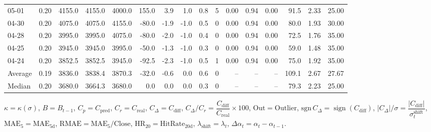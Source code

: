 \begin{threeparttable}
{\begin{tabular}{lrrrrrrrrrrrrrrr}
  05-01 &     0.20 & 4155.0 & 4155.0 & 4000.0 &      155.0 &            3.9 &                      1.0 &                 0.8 &              5 &       0.00 &      0.94 &           0.00 &             91.5 &            2.33 &                  25.00 \\
  04-30 &     0.20 & 4075.0 & 4075.0 & 4155.0 &      -80.0 &           -1.9 &                     -1.0 &                 0.5 &              0 &       0.00 &      0.94 &           0.00 &             80.0 &            1.93 &                  30.00 \\
  04-28 &     0.20 & 3995.0 & 3995.0 & 4075.0 &      -80.0 &           -2.0 &                     -1.0 &                 0.4 &              0 &       0.00 &      0.94 &           0.00 &             72.5 &            1.76 &                  35.00 \\
  04-25 &     0.20 & 3945.0 & 3945.0 & 3995.0 &      -50.0 &           -1.3 &                     -1.0 &                 0.3 &              0 &       0.00 &      0.94 &           0.00 &             59.0 &            1.48 &                  35.00 \\
  04-24 &     0.20 & 3852.5 & 3852.5 & 3945.0 &      -92.5 &           -2.3 &                     -1.0 &                 0.5 &              1 &       0.00 &      0.94 &           0.00 &             75.0 &            1.92 &                  35.00 \\
Average &     0.19 & 3836.0 & 3838.4 & 3870.3 &      -32.0 &           -0.6 &                      0.0 &                 0.6 &              0 &         -- &        -- &             -- &            109.1 &            2.67 &                  27.67 \\
 Median &     0.20 & 3680.0 & 3664.3 & 3680.0 &        0.0 &            0.0 &                      0.0 &                 0.3 &              0 &         -- &        -- &             -- &             79.3 &            2.23 &                  25.00 \\
\bottomrule
\end{tabular}
}
\begin{tablenotes}\footnotesize
\item $\kappa=\kappa(\sigma)$, $B=B_{t-1}$, $C_p=C_{\text{pred}}$, $C_r=C_{\text{real}}$, $C_\Delta=C_{\text{diff}}$, $C_\Delta/C_r=\dfrac{C_{\text{diff}}}{C_{\text{real}}}\times100$, $\mathrm{Out}=\text{Outlier}$, $\mathrm{sgn}\,C_\Delta=\operatorname{sign}(C_{\text{diff}})$, $|C_\Delta|/\sigma=\dfrac{|C_{\text{diff}}|}{\sigma_t^{\text{shift}}}$, $\mathrm{MAE}_5=\mathrm{MAE}_{5\text{d}}$, $\mathrm{RMAE}= \mathrm{MAE}_5 / \text{Close}$, $\mathrm{HR}_{20}=\mathrm{HitRate}_{20\text{d}}$, 
$\lambda_{\text{shift}}=\lambda_t$, 
$\Delta\alpha_t=\alpha_t-\alpha_{t-1}$.
\end{tablenotes}
\end{threeparttable}
\endgroup

